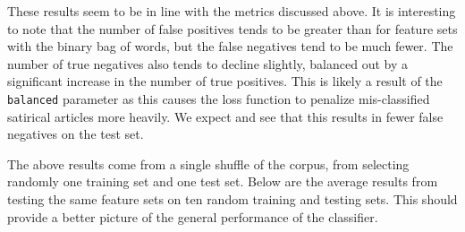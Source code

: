 \documentclass [12 pt] {report}
\begin{document}
\vspace*{-2mm}
\begin{table}[H]
\small
{}
\label{table:TFAll, ND}
\end{table}

These results seem to be in line with the metrics discussed above. It is interesting to note that the number of false positives tends to be greater than for feature sets with the binary bag of words, but the false negatives tend to be much fewer. The number of true negatives also tends to decline slightly, balanced out by a significant increase in the number of true positives. This is likely a result of the \texttt{balanced} parameter as this causes the loss function to penalize mis-classified satirical articles more heavily. We expect and see that this results in fewer false negatives on the test set.

The above results come from a single shuffle of the corpus, from selecting randomly one training set and one test set. Below are the average results from testing the same feature sets on ten random training and testing sets. This should provide a better picture of the general performance of the classifier.
\end{document}
